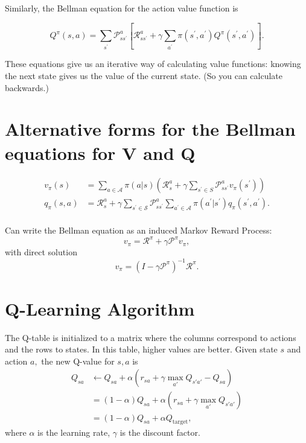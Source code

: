 \documentclass[17pt]{extarticle}
\theoremstyle{plain}
\theoremstyle{definition}
\theoremstyle{remark}
\newcommand{\0}{\varnothing}
\newcommand{\<}{\langle}
\renewcommand{\>}{\rangle}
\begin{document}
Similarly, the Bellman equation for the action value function is

\[
Q ^ { \pi } ( s , a ) = \sum _ { s ^ { \prime } } \mathcal { P } _ { s s ^ { \prime } } ^ { a } \left[ \mathcal { R } _ { s s ^ { \prime } } ^ { a } + \gamma \sum _ { a ^ { \prime } } \pi \left( s ^ { \prime } , a ^ { \prime } \right) Q ^ { \pi } \left( s ^ { \prime } , a ^ { \prime } \right) \right].
\]

These equations give us an iterative way of calculating value functions: knowing the next state gives us the value of the current state. (So you can calculate backwards.)

\section{Alternative forms for the Bellman equations for V and Q}

\begin{align*}
v _ { \pi } ( s ) &= \sum _ { a \in \mathcal { A } } \pi ( a | s ) \left( \mathcal { R } _ { s } ^ { a } + \gamma \sum _ { s ^ { \prime } \in S } \mathcal { P } _ { s s ^ { \prime } } ^ { a } v _ { \pi } \left( s ^ { \prime } \right) \right) \\
q _ { \pi } ( s , a ) &= \mathcal { R } _ { s } ^ { a } + \gamma \sum _ { s ^ { \prime } \in \mathcal { S } } \mathcal { P } _ { s s ^ { \prime } } ^ { a } \sum _ { a ^ { \prime } \in \mathcal { A } } \pi \left( a ^ { \prime } | s ^ { \prime } \right) q _ { \pi } \left( s ^ { \prime } , a ^ { \prime } \right). \\
\end{align*}

Can write the Bellman equation as an induced Markov Reward Process:
\[
v _ { \pi } = \mathcal { R } ^ { \pi } + \gamma \mathcal { P } ^ { \pi } v _ { \pi },
\]
with direct solution
\[
v _ { \pi } = \left( I - \gamma \mathcal { P } ^ { \pi } \right) ^ { - 1 } \mathcal { R } ^ { \pi }.
\]


\section{Q-Learning Algorithm}

The Q-table is initialized to a matrix where the columns correspond to actions
and the rows to states. In this table, higher values are better. Given state \(
s \) and action \( a, \) the new Q-value for \( s,  a \) is
\begin{align*}
Q_{sa} &\gets Q_{sa} + \alpha (r_{sa} + \gamma \max_{a'} Q_{s'a'} - Q_{sa}) \\
&= (1 - \alpha) Q_{sa} + \alpha (r_{sa} + \gamma \max_{a'} Q_{s'a'}) \\
&= (1 - \alpha) Q_{sa} + \alpha Q_{\text{target}},
\end{align*}
where \( \alpha \) is the learning rate, \( \gamma \) is the discount factor.
\end{document}
